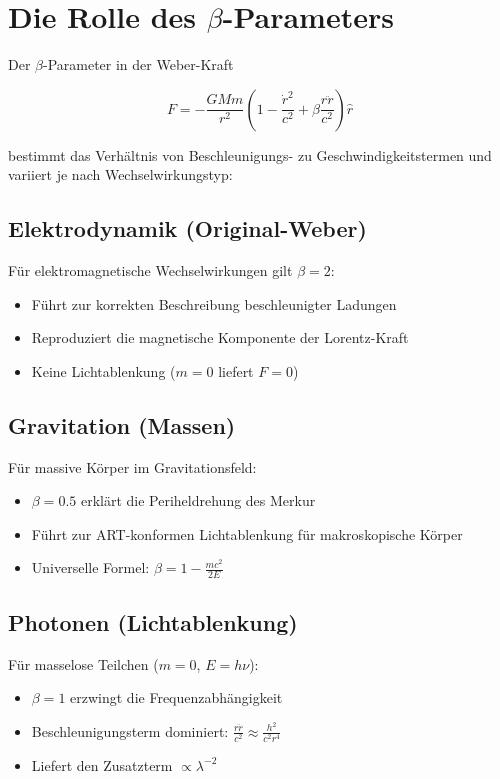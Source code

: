\section{Die Rolle des $\beta$-Parameters}

Der $\beta$-Parameter in der Weber-Kraft

\begin{equation}
F = -\frac{GMm}{r^2}\left(1 - \frac{\dot{r}^2}{c^2} + \beta\frac{r\ddot{r}}{c^2}\right)\hat{r}
\end{equation}

bestimmt das Verhältnis von Beschleunigungs- zu Geschwindigkeitstermen und variiert je nach Wechselwirkungstyp:

\subsection{Elektrodynamik (Original-Weber)}
Für elektromagnetische Wechselwirkungen gilt $\beta=2$:
\begin{itemize}
\item Führt zur korrekten Beschreibung beschleunigter Ladungen
\item Reproduziert die magnetische Komponente der Lorentz-Kraft
\item Keine Lichtablenkung ($m=0$ liefert $F=0$)
\end{itemize}

\subsection{Gravitation (Massen)}
Für massive Körper im Gravitationsfeld:
\begin{itemize}
\item $\beta=0.5$ erklärt die Periheldrehung des Merkur
\item Führt zur ART-konformen Lichtablenkung für makroskopische Körper
\item Universelle Formel: $\beta = 1 - \frac{mc^2}{2E}$
\end{itemize}

\subsection{Photonen (Lichtablenkung)}
Für masselose Teilchen ($m=0$, $E=h\nu$):
\begin{itemize}
\item $\beta=1$ erzwingt die Frequenzabhängigkeit
\item Beschleunigungsterm dominiert: $\frac{r\ddot{r}}{c^2} \approx \frac{h^2}{c^2r^4}$
\item Liefert den Zusatzterm $\propto \lambda^{-2}$
\end{itemize}

